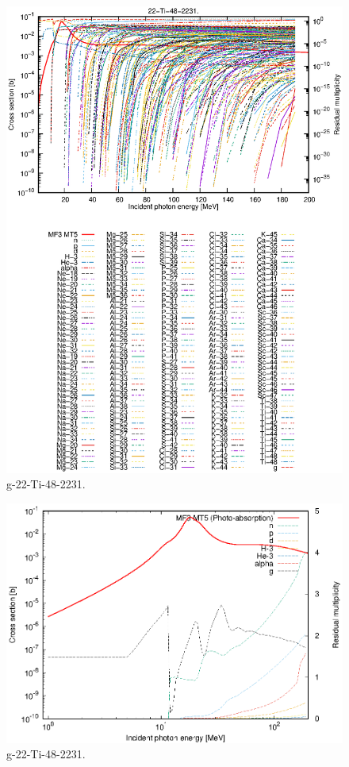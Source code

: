 \begin{figure}
 \includegraphics[width=\linewidth]{eps/g_22-Ti-48_2231.eps}
  \caption{g-22-Ti-48-2231.}
\end{figure}
\newpage \clearpage

\begin{figure}
 \includegraphics[width=\linewidth]{eps-log/g_22-Ti-48_2231.eps}
 \caption{g-22-Ti-48-2231.}
\end{figure}
\newpage \clearpage

